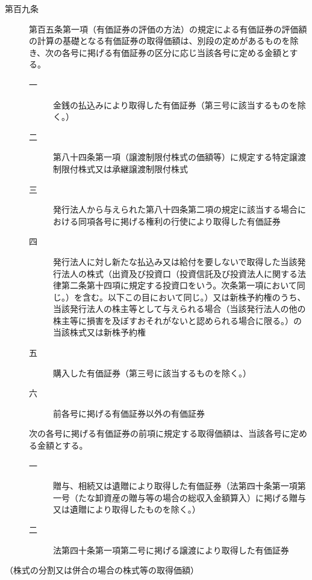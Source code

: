 \documentclass[twocolumn,a4j,10pt]{ltjtarticle}
\begin{document}
\begin{description}
\item[第百九条]第百五条第一項（有価証券の評価の方法）の規定による有価証券の評価額の計算の基礎となる有価証券の取得価額は、別段の定めがあるものを除き、次の各号に掲げる有価証券の区分に応じ当該各号に定める金額とする。
\begin{description}
\item[一]金銭の払込みにより取得した有価証券（第三号に該当するものを除く。）
\item[二]第八十四条第一項（譲渡制限付株式の価額等）に規定する特定譲渡制限付株式又は承継譲渡制限付株式
\item[三]発行法人から与えられた第八十四条第二項の規定に該当する場合における同項各号に掲げる権利の行使により取得した有価証券
\item[四]発行法人に対し新たな払込み又は給付を要しないで取得した当該発行法人の株式（出資及び投資口（投資信託及び投資法人に関する法律第二条第十四項に規定する投資口をいう。次条第一項において同じ。）を含む。以下この目において同じ。）又は新株予約権のうち、当該発行法人の株主等として与えられる場合（当該発行法人の他の株主等に損害を及ぼすおそれがないと認められる場合に限る。）の当該株式又は新株予約権
\item[五]購入した有価証券（第三号に該当するものを除く。）
\item[六]前各号に掲げる有価証券以外の有価証券
\end{description}
\item[]次の各号に掲げる有価証券の前項に規定する取得価額は、当該各号に定める金額とする。
\begin{description}
\item[一]贈与、相続又は遺贈により取得した有価証券（法第四十条第一項第一号（たな卸資産の贈与等の場合の総収入金額算入）に掲げる贈与又は遺贈により取得したものを除く。）
\item[二]法第四十条第一項第二号に掲げる譲渡により取得した有価証券
\end{description}
\end{description}
\noindent\hspace{10pt}（株式の分割又は併合の場合の株式等の取得価額）
\end{document}
